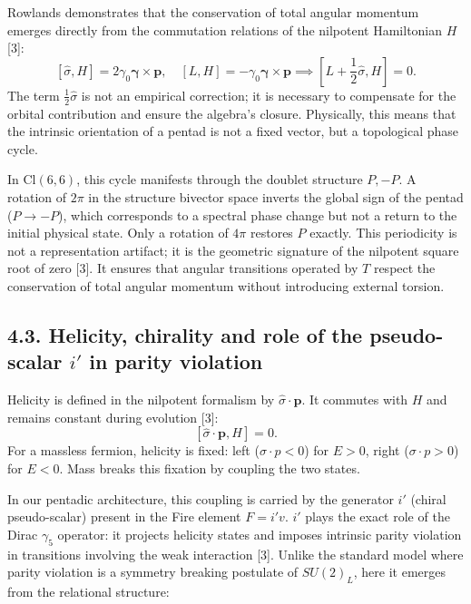 \documentclass[11pt]{article}
\begin{document}
Rowlands demonstrates that the conservation of total angular momentum
emerges directly from the commutation relations of the nilpotent
Hamiltonian \(H\) {[}3{]}: \[
[\hat{\sigma}, H] = 2\gamma_0 \boldsymbol{\gamma} \times \mathbf{p}, \quad [L, H] = -\gamma_0 \boldsymbol{\gamma} \times \mathbf{p} \implies \left[L + \frac{1}{2}\hat{\sigma}, H\right] = 0.
\] The term \(\frac{1}{2}\hat{\sigma}\) is not an empirical correction;
it is necessary to compensate for the orbital contribution and ensure
the algebra's closure. Physically, this means that the intrinsic
orientation of a pentad is not a fixed vector, but a topological phase
cycle.

In \(\text{Cl}(6,6)\), this cycle manifests through the doublet
structure \({P, -P}\). A rotation of \(2\pi\) in the structure bivector
space inverts the global sign of the pentad (\(P \to -P\)), which
corresponds to a spectral phase change but not a return to the initial
physical state. Only a rotation of \(4\pi\) restores \(P\) exactly. This
periodicity is not a representation artifact; it is the geometric
signature of the nilpotent square root of zero {[}3{]}. It ensures that
angular transitions operated by \(T\) respect the conservation of total
angular momentum without introducing external torsion.

\hypertarget{helicity-chirality-and-role-of-the-pseudo-scalar-i-in-parity-violation}{%
\subsection{\texorpdfstring{4.3. Helicity, chirality and role of the
pseudo-scalar \(i'\) in parity
violation}{4.3. Helicity, chirality and role of the pseudo-scalar i' in parity violation}}\label{helicity-chirality-and-role-of-the-pseudo-scalar-i-in-parity-violation}}

Helicity is defined in the nilpotent formalism by
\(\hat{\sigma}\cdot\mathbf{p}\). It commutes with \(H\) and remains
constant during evolution {[}3{]}: \[
[\hat{\sigma}\cdot\mathbf{p}, H] = 0.
\] For a massless fermion, helicity is fixed: left
(\(\sigma\cdot p < 0\)) for \(E>0\), right (\(\sigma\cdot p > 0\)) for
\(E<0\). Mass breaks this fixation by coupling the two states.

In our pentadic architecture, this coupling is carried by the generator
\(i'\) (chiral pseudo-scalar) present in the Fire element \(F = i'v\).
\(i'\) plays the exact role of the Dirac \(\gamma_5\) operator: it
projects helicity states and imposes intrinsic parity violation in
transitions involving the weak interaction {[}3{]}. Unlike the standard
model where parity violation is a symmetry breaking postulate of
\(SU(2)_L\), here it emerges from the relational structure:
\end{document}

